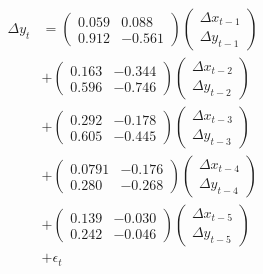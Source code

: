 \documentclass{article}
\begin{document}
\begin{align*}
  \Delta y_t &= \begin{pmatrix} 0.059 & 0.088 \\
                                0.912 & -0.561 \end{pmatrix}
                \begin{pmatrix} \Delta x_{t-1} \\
                                \Delta y_{t-1} \end{pmatrix} \\
             &+ \begin{pmatrix} 0.163 & -0.344 \\
                                0.596 & -0.746  \end{pmatrix}
                \begin{pmatrix} \Delta x_{t-2} \\
                                \Delta y_{t-2} \end{pmatrix} \\
             &+ \begin{pmatrix} 0.292 & -0.178 \\
                                0.605 & -0.445 \end{pmatrix}
                \begin{pmatrix} \Delta x_{t-3} \\
                                \Delta y_{t-3} \end{pmatrix} \\
             &+ \begin{pmatrix} 0.0791 & -0.176 \\
                                0.280 & -0.268  \end{pmatrix}
                \begin{pmatrix} \Delta x_{t-4} \\
                                \Delta y_{t-4} \end{pmatrix} \\
             &+ \begin{pmatrix} 0.139 & -0.030 \\
                                0.242 & -0.046  \end{pmatrix}
                \begin{pmatrix} \Delta x_{t-5} \\
                                \Delta y_{t-5} \end{pmatrix} \\
             &+ \epsilon_t \\
\end{align*}
\end{document}
